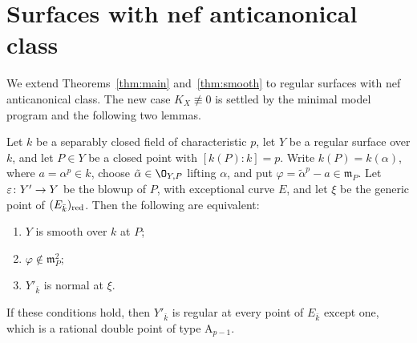 \section{Surfaces with nef anticanonical class}\label{sec:applications}

We extend Theorems~\ref{thm:main} and~\ref{thm:smooth} to regular surfaces with nef anticanonical class.
The new case $K_X\not\equiv 0$ is settled by the minimal model program and the following two lemmas.

\begin{lemma}\label{lem:degree-p-blowup}
Let $k$ be a separably closed field of characteristic $p$, let $Y$ be a regular surface over $k$, and let $P\in Y$ be a closed point with $[k(P):k] = p$.
Write $k(P) = k(\alpha)$, where $a = \alpha^p\in k$, choose $\tilde\alpha\in\O_{Y,P}$ lifting $\alpha$, and put $\varphi = \tilde\alpha^p-a\in\mathfrak m_P$.
Let $\varepsilon\colon Y'\to Y$ be the blowup of $P$, with exceptional curve $E$, and let $\xi$ be the generic point of $(E_{\bar k})_{\rm red}$.
Then the following are equivalent:
\begin{enumerate}
\item $Y$ is smooth over $k$ at $P$;
\item $\varphi\notin\mathfrak m_P^2$;
\item $Y'_{\bar k}$ is normal at $\xi$.
\end{enumerate}
If these conditions hold, then $Y'_{\bar k}$ is regular at every point of $E_{\bar k}$ except one, which is a rational double point of type $\mathrm A_{p-1}$.
\end{lemma}

